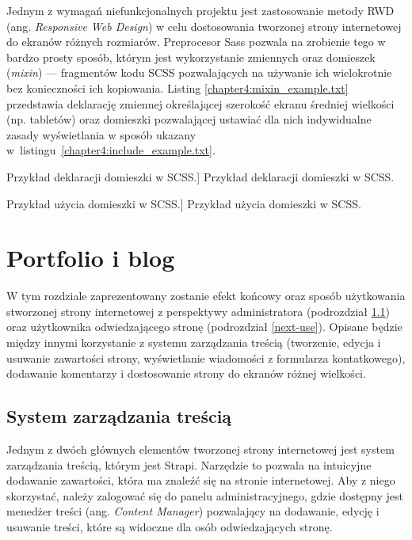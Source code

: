 \documentclass[a4paper, 12pt]{article}
\numberwithin{figure}{section}
\begin{document}
\begin{sloppypar}
Jednym z wymagań niefunkcjonalnych projektu jest zastosowanie metody RWD (ang. \textit{Responsive Web Design}) w celu dostosowania tworzonej strony internetowej do ekranów różnych rozmiarów. Preprocesor Sass pozwala na zrobienie tego w bardzo prosty sposób, którym jest wykorzystanie zmiennych oraz domieszek (\textit{mixin}) --- fragmentów kodu SCSS pozwalających na używanie ich wielokrotnie bez konieczności ich kopiowania. Listing \ref{chapter4:mixin_example.txt} przedstawia deklarację zmiennej określającej szerokość ekranu średniej wielkości (np. tabletów) oraz domieszki pozwalającej ustawiać dla nich indywidualne zasady wyświetlania w sposób ukazany w~listingu~\ref{chapter4:include_example.txt}. 

\begin{code}[htbp]
    
    \caption
    [Przykład deklaracji domieszki w SCSS.]
    {Przykład deklaracji domieszki w SCSS.}
    \label{chapter4:mixin_example.txt}
\end{code}

\begin{code}[htbp]
    
    \caption
    [Przykład użycia domieszki w SCSS.]
    {Przykład użycia domieszki w SCSS.}
    \label{chapter4:include_example.txt}
\end{code}


\clearpage
\section{Portfolio i blog}

W tym rozdziale zaprezentowany zostanie efekt końcowy oraz sposób użytkowania stworzonej strony internetowej z perspektywy administratora (podrozdział \ref{strapi-use}) oraz użytkownika odwiedzającego stronę (podrozdział \ref{next-use}). Opisane będzie między innymi korzystanie z systemu zarządzania treścią (tworzenie, edycja i usuwanie zawartości strony, wyświetlanie wiadomości z formularza kontatkowego), dodawanie komentarzy i dostosowanie strony do ekranów różnej wielkości. 


\subsection{System zarządzania treścią} \label{strapi-use}

Jednym z dwóch głównych elementów tworzonej strony internetowej jest system zarządzania treścią, którym jest Strapi. Narzędzie to pozwala na intuicyjne dodawanie zawartości, która ma znaleźć się na stronie internetowej. Aby z niego skorzystać, należy zalogować się do panelu administracyjnego, gdzie dostępny jest menedżer treści (ang. \textit{Content Manager}) pozwalający na dodawanie, edycję i usuwanie treści, które są widoczne dla osób odwiedzających stronę. 


\end{sloppypar}
\end{document}
